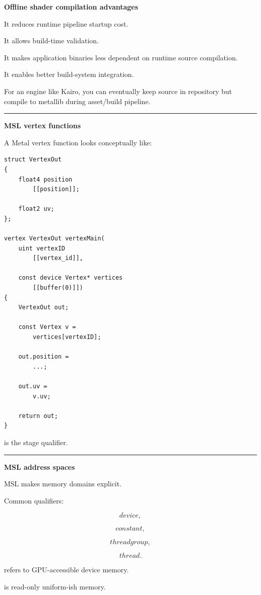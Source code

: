 \textbf{Offline shader compilation advantages}

It reduces runtime pipeline startup cost.

It allows build-time validation.

It makes application binaries less dependent on runtime source compilation.

It enables better build-system integration.

For an engine like Kairo, you can eventually keep source in repository but compile to metallib during asset/build pipeline.

\begin{center}\rule{0.5\linewidth}{0.5pt}\end{center}

\textbf{MSL vertex functions}

A Metal vertex function looks conceptually like:

\begin{verbatim}
struct VertexOut
{
    float4 position
        [[position]];

    float2 uv;
};

vertex VertexOut vertexMain(
    uint vertexID
        [[vertex_id]],

    const device Vertex* vertices
        [[buffer(0)]])
{
    VertexOut out;

    const Vertex v =
        vertices[vertexID];

    out.position =
        ...;

    out.uv =
        v.uv;

    return out;
}
\end{verbatim}

 is the stage qualifier.

\begin{center}\rule{0.5\linewidth}{0.5pt}\end{center}

\textbf{MSL address spaces}

MSL makes memory domains explicit.

Common qualifiers:

\[
device,
\]

\[
constant,
\]

\[
threadgroup,
\]

\[
thread.
\]

 refers to GPU-accessible device memory.

 is read-only uniform-ish memory.


